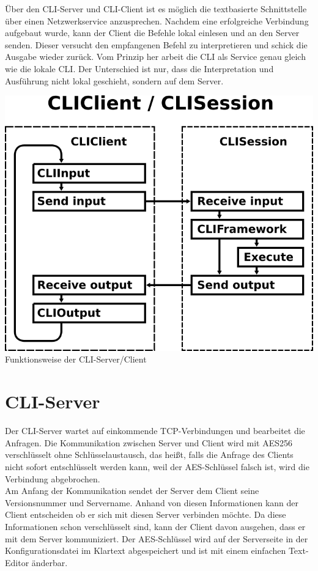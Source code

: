 \documentclass[12pt,a4paper]{report}
\begin{document}
\begin{onehalfspace}
Über den CLI-Server und CLI-Client ist es möglich die textbasierte Schnittstelle über einen Netzwerkservice anzusprechen. Nachdem eine erfolgreiche Verbindung aufgebaut wurde, kann der Client die Befehle lokal einlesen und an den Server senden. Dieser versucht den empfangenen Befehl zu interpretieren und schick die Ausgabe wieder zurück. Vom Prinzip her arbeit die CLI als Service genau gleich wie die lokale CLI. Der Unterschied ist nur, dass die Interpretation und Ausführung nicht lokal geschieht, sondern auf dem Server.

\begin{center}
\includegraphics[scale=2.0]{img/mad_client_session.png}\\
Funktionsweise der CLI-Server/Client
\end{center}

\section{CLI-Server}

Der CLI-Server wartet auf einkommende TCP-Verbindungen und bearbeitet die Anfragen. Die Kommunikation zwischen Server und Client wird mit AES256 verschlüsselt ohne Schlüsselaustausch, das heißt, falls die Anfrage des Clients nicht sofort entschlüsselt werden kann, weil der AES-Schlüssel falsch ist, wird die Verbindung abgebrochen.\\
Am Anfang der Kommunikation sendet der Server dem Client seine Versionsnummer und Servername. Anhand von diesen Informationen kann der Client entscheiden ob er sich mit diesen Server verbinden möchte. Da diese Informationen schon verschlüsselt sind, kann der Client davon ausgehen, dass er mit dem Server kommuniziert. Der AES-Schlüssel wird auf der Serverseite in der Konfigurationsdatei im Klartext abgespeichert und ist mit einem einfachen Text-Editor änderbar.


\end{onehalfspace}
\end{document}
